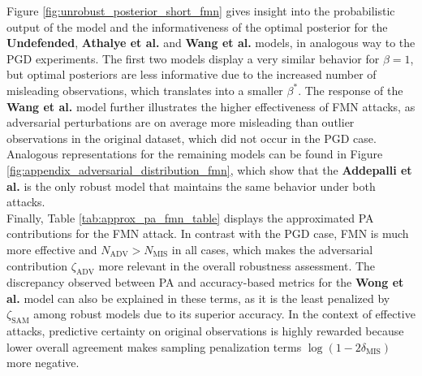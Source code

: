 Figure \ref{fig:unrobust_posterior_short_fmn} gives insight into the probabilistic output
of the model and the informativeness of the optimal posterior for the {\color{tab:orange} \textbf{Undefended}}, 
{\color{tab:green} \textbf{Athalye et al.}} and {\color{tab:brown} \textbf{Wang et al.}} models, in
analogous way to the PGD experiments. The first two models display a very similar behavior for 
$\beta = 1$, but optimal posteriors are less informative due to the increased number of misleading
observations, which translates into a smaller $\beta^{*}$. The response of 
the {\color{tab:brown} \textbf{Wang et al.}} model further illustrates the higher effectiveness of
FMN attacks, as adversarial perturbations are on average more misleading than outlier observations in
the original dataset, which did not occur in the PGD case. Analogous representations for the remaining
models can be found in Figure \ref{fig:appendix_adversarial_distribution_fmn}, which show
that the {\color{tab:purple} \textbf{Addepalli et al.}} is the only robust model that maintains
the same behavior under both attacks.\\

Finally, Table \ref{tab:approx_pa_fmn_table} displays the approximated PA contributions for the FMN attack.
In contrast with the PGD case, FMN is much more effective and $N_{\text{ADV}} > N_{\text{MIS}}$
in all cases, which makes the adversarial contribution $\zeta_{\text{ADV}}$ more relevant in the
overall robustness assessment. The discrepancy observed between PA and
accuracy-based metrics for the {\color{tab:red} \textbf{Wong et al.}} model can also be explained 
in these terms, as it is the least penalized by $\zeta_{\text{SAM}}$ among robust models due to its
superior accuracy. In the context of effective attacks, predictive certainty on
original observations is highly rewarded because lower overall agreement makes sampling penalization terms
$\log(1 - 2 \delta_{\text{MIS}})$ more negative. \\

